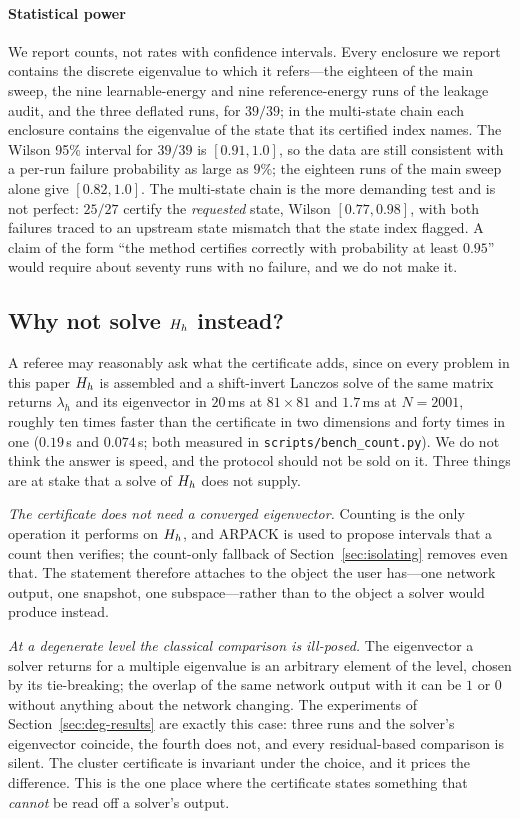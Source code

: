 \paragraph{Statistical power} We report counts, not rates with confidence
intervals. Every enclosure we report contains the discrete eigenvalue to which
it refers---the eighteen of the main sweep, the nine learnable-energy and nine
reference-energy runs of the leakage audit, and the three deflated runs, for
$39/39$; in the multi-state chain each enclosure contains the eigenvalue of
the state that its certified index names. The Wilson 95\% interval for
$39/39$ is $[0.91,1.0]$, so the data are
still consistent with a per-run failure probability as large as $9\%$; the
eighteen runs of the main sweep alone give $[0.82,1.0]$. The multi-state chain
is the more demanding test and is not perfect: $25/27$ certify the
\emph{requested} state, Wilson $[0.77,0.98]$, with both failures traced to an
upstream state mismatch that the state index flagged. A claim of the form
``the method certifies correctly with probability at least $0.95$'' would
require about seventy runs with no failure, and we do not make it.

\subsection{Why not solve \texorpdfstring{$H_h$}{H\_h} instead?}
\label{sec:why}

A referee may reasonably ask what the certificate adds, since on every
problem in this paper $H_h$ is assembled and a shift-invert Lanczos solve of
the same matrix returns $\lambda_h$ and its eigenvector in $20$\,ms at
$81\times81$ and $1.7$\,ms at $N=2001$, roughly ten times faster than the
certificate in two dimensions and forty times in one ($0.19$\,s and
$0.074$\,s; both measured in
\texttt{scripts/bench\_count.py}). We do not think the answer is speed, and
the protocol should not be sold on it. Three things are at stake that a solve of $H_h$
does not supply.

\emph{The certificate does not need a converged eigenvector.} Counting is the
only operation it performs on $H_h$, and ARPACK is used to propose intervals
that a count then verifies; the count-only fallback of
Section~\ref{sec:isolating} removes even that. The statement therefore
attaches to the object the user has---one network output, one snapshot, one
subspace---rather than to the object a solver would produce instead.

\emph{At a degenerate level the classical comparison is ill-posed.} The
eigenvector a solver returns for a multiple eigenvalue is an arbitrary element
of the level, chosen by its tie-breaking; the overlap of the same network
output with it can be $1$ or $0$ without anything about the network
changing. The experiments of Section~\ref{sec:deg-results} are exactly this
case: three runs and the solver's eigenvector coincide, the fourth does not,
and every residual-based comparison is silent. The cluster certificate is
invariant under the choice, and it prices the difference. This is the one
place where the certificate states something that \emph{cannot} be read off a
solver's output.

